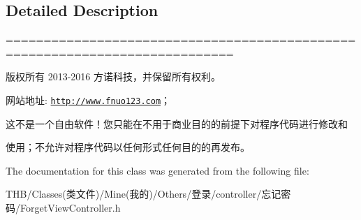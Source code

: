 \subsection{Detailed Description}
============================================================================

版权所有 2013-\/2016 方诺科技，并保留所有权利。

网站地址\+: \href{http://www.fnuo123.com}{\tt http\+://www.\+fnuo123.\+com}； 



这不是一个自由软件！您只能在不用于商业目的的前提下对程序代码进行修改和

使用；不允许对程序代码以任何形式任何目的的再发布。 

 

The documentation for this class was generated from the following file\+:\begin{DoxyCompactItemize}
\item 
T\+H\+B/\+Classes(类文件)/\+Mine(我的)/\+Others/登录/controller/忘记密码/Forget\+View\+Controller.\+h\end{DoxyCompactItemize}
